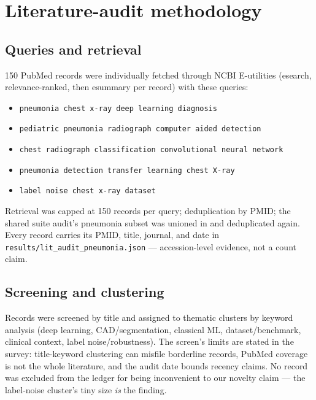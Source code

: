 
\section{Literature-audit methodology}
\subsection{Queries and retrieval}
150 PubMed records were individually fetched through NCBI E-utilities
(esearch, relevance-ranked, then esummary per record) with these queries:
\begin{itemize}
\item \texttt{pneumonia chest x-ray deep learning diagnosis}
\item \texttt{pediatric pneumonia radiograph computer aided detection}
\item \texttt{chest radiograph classification convolutional neural network}
\item \texttt{pneumonia detection transfer learning chest X-ray}
\item \texttt{label noise chest x-ray dataset}
\end{itemize}
Retrieval was capped at 150 records per query; deduplication by PMID; the
shared suite audit's pneumonia subset was unioned in and deduplicated again.
Every record carries its PMID, title, journal, and date in
\texttt{results/lit\_audit\_pneumonia.json} --- accession-level evidence, not
a count claim.
\subsection{Screening and clustering}
Records were screened by title and assigned to thematic clusters by
keyword analysis (deep learning, CAD/segmentation, classical ML,
dataset/benchmark, clinical context, label noise/robustness). The
screen's limits are stated in the survey: title-keyword clustering can
misfile borderline records, PubMed coverage is not the whole literature,
and the audit date bounds recency claims. No record was excluded from the
ledger for being inconvenient to our novelty claim --- the label-noise
cluster's tiny size \emph{is} the finding.
